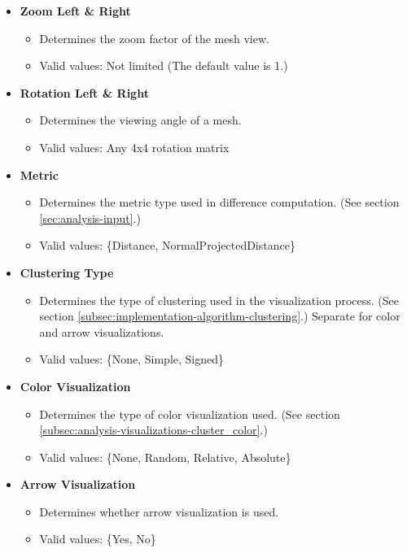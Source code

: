 \begin{itemize}
\item {\bf Zoom Left \& Right} 
	\begin{itemize}
		\item Determines the zoom factor of the mesh view.
		\item Valid values: Not limited (The default value is 1.)
	\end{itemize}

\item {\bf Rotation Left \& Right}
	\begin{itemize}
		\item Determines the viewing angle of a mesh.
		\item Valid values: Any 4x4 rotation matrix
	\end{itemize}
 
\item {\bf Metric}
	\begin{itemize}
		\item Determines the metric type used in difference computation. (See section \ref{sec:analysis-input}.)
		\item Valid values: \{Distance, NormalProjectedDistance\}
	\end{itemize}
 
\item {\bf Clustering Type}
	\begin{itemize}
		\item Determines the type of clustering used in the visualization process. (See section \ref{subsec:implementation-algorithm-clustering}.) Separate for color and arrow visualizations.
		\item Valid values: \{None, Simple, Signed\}
	\end{itemize}
 
\item {\bf Color Visualization}
	\begin{itemize}
		\item Determines the type of color visualization used. (See section \ref{subsec:analysis-visualizations-cluster_color}.)
		\item Valid values: \{None, Random, Relative, Absolute\}
	\end{itemize}
 
\item {\bf Arrow Visualization}
	\begin{itemize}
		\item Determines whether arrow visualization is used.
		\item Valid values: \{Yes, No\}
	\end{itemize}
\end{itemize}

